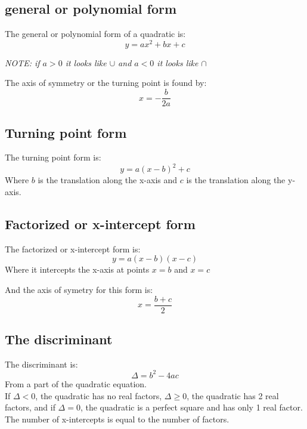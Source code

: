 \documentclass[a4paper,10pt]{report}
\begin{document}
\subsection{general or polynomial form}
The general or polynomial form of a quadratic is:
$$
	y = ax^2 + bx + c
$$
\begin{center}
	\emph{NOTE: if $a > 0$ it looks like $\cup$ and $a < 0$ it looks like $\cap$}
\end{center}
The axis of symmetry or the turning point is found by:
$$
	x = -\frac{b}{2a}
$$

\subsection{Turning point form}
The turning point form is:
$$
	y = a(x - b)^2 + c
$$
Where $b$ is the translation along the x-axis and $c$ is the translation along the y-axis.

\subsection{Factorized or x-intercept form}
The factorized or x-intercept form is:
$$
	y = a(x - b)(x - c)
$$
Where it intercepts the x-axis at points $x = b$ and $x = c$

And the axis of symetry for this form is:
$$
	x = \frac{b + c}{2}
$$

\subsection{The discriminant}
The discriminant is:
$$
	\Delta = b^2 - 4ac
$$
From a part of the quadratic equation.\\
If $\Delta < 0$, the quadratic has no real factors, $\Delta \geq 0$, the quadratic has 2 real factors, and if $\Delta = 0$, the quadratic is a perfect square and has only 1 real factor.  The number of x-intercepts is equal to the number of factors.
\end{document}
